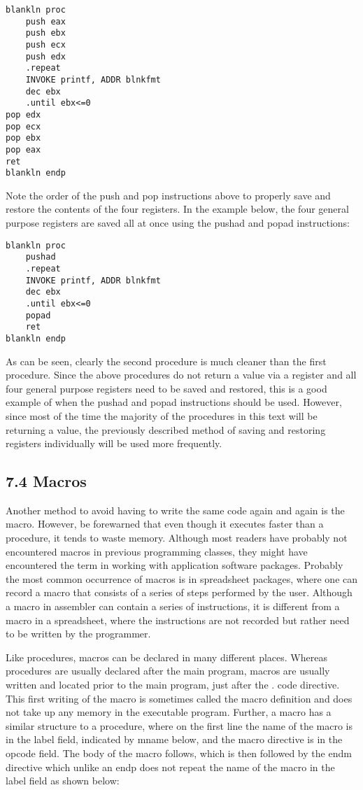 \documentclass[10pt]{article}
\begin{document}
\begin{verbatim}
blankln proc
    push eax
    push ebx
    push ecx
    push edx
    .repeat
    INVOKE printf, ADDR blnkfmt
    dec ebx
    .until ebx<=0
pop edx
pop ecx
pop ebx
pop eax
ret
blankln endp
\end{verbatim}

Note the order of the push and pop instructions above to properly save and restore the contents of the four registers. In the example below, the four general purpose registers are saved all at once using the pushad and popad instructions:

\begin{verbatim}
blankln proc
    pushad
    .repeat
    INVOKE printf, ADDR blnkfmt
    dec ebx
    .until ebx<=0
    popad
    ret
blankln endp
\end{verbatim}

As can be seen, clearly the second procedure is much cleaner than the first procedure. Since the above procedures do not return a value via a register and all four general purpose registers need to be saved and restored, this is a good example of when the pushad and popad instructions should be used. However, since most of the time the majority of the procedures in this text will be returning a value, the previously described method of saving and restoring registers individually will be used more frequently.

\subsection*{7.4 Macros}
Another method to avoid having to write the same code again and again is the macro. However, be forewarned that even though it executes faster than a procedure, it tends to waste memory. Although most readers have probably not encountered macros in previous programming classes, they might have encountered the term in working with application software packages. Probably the most common occurrence of macros is in spreadsheet packages, where one can record a macro that consists of a series of steps performed by the user. Although a macro in assembler can contain a series of instructions, it is different from a macro in a spreadsheet, where the instructions are not recorded but rather need to be written by the programmer.

Like procedures, macros can be declared in many different places. Whereas procedures are usually declared after the main program, macros are usually written and located prior to the main program, just after the . code directive. This first writing of the macro is sometimes called the macro definition and does not take up any memory in the executable program. Further, a macro has a similar structure to a procedure, where on the first line the name of the macro is in the label field, indicated by mname below, and the macro directive is in the opcode field. The body of the macro follows, which is then followed by the endm directive which unlike an endp does not repeat the name of the macro in the label field as shown below:
\end{document}
